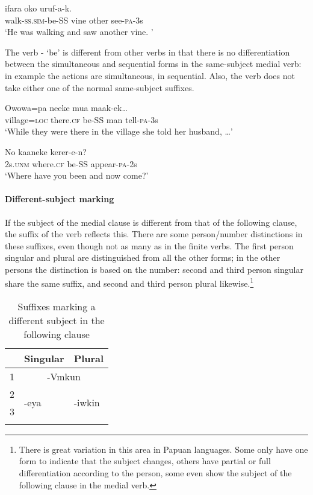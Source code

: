 \ea%
\label{ex:3:x241}
\gll {} ifara oko uruf-a-k. \\
walk-\textsc{ss}.\textsc{sim}-be-SS vine other see-\textsc{pa}-3s \\
\glt`He was walking and saw another vine. '
\z

The verb - `be' is different from other verbs in that there is no differentiation between the simultaneous and sequential forms in the same-subject medial verb: in example  the actions are simultaneous, in  sequential. Also, the verb does not take either one of the normal same-subject suffixes.

\ea%
\label{ex:3:x242}
\gll Owowa=pa neeke  mua maak-ek{\dots} \\
village=\textsc{loc} there.\textsc{cf} be-SS man tell-\textsc{pa}-3s \\
\glt`While they were there in the village she told her husband, {\dots}'
\z

\ea%
\label{ex:3:x243}
\gll No kaaneke  kerer-e-n? \\
2s.\textsc{unm} where.\textsc{cf} be-SS appear-\textsc{pa}-2s \\
\glt`Where have you been and now come?' 
\z

\paragraph{Different-subject marking}\label{sec:3:a:z:y:x}
{}
If the subject of the medial clause is different from that of the following clause, the suffix of the  verb reflects this. There are some person/number distinctions in these suffixes, even though not as many as in the finite verbs. The first person singular and plural are distinguished from all the other forms; in the other persons the distinction is based on the number: second and third person singular share the same suffix, and second and third person plural likewise.\footnote{There is great variation in this area in Papuan languages. Some only have one form to indicate that the subject changes, others have partial or full differentiation according to the person, some even show the subject of the following clause in the medial verb.} 


\begin{table}\begin{tabular}{lll}
\mytoprule
 & Singular & Plural\\
\midrule 
1 & \multicolumn{2}{c}{-Vmkun}\\
2 & \multirow{2}{*}{-eya} & \multirow{2}{*}{-iwkin}\\
3 & & \\ 
\mybottomrule 
\end{tabular}
\caption{Suffixes marking a different subject in the following clause}
\label{tab:14}
\end{table}

